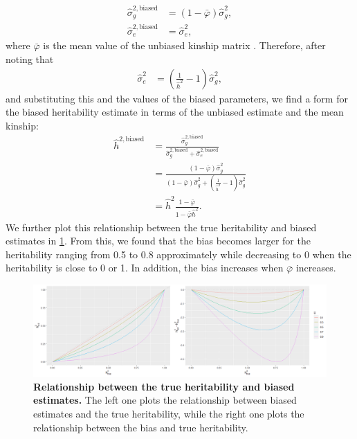 \documentclass[11pt]{article}
\begin{document}
\begin{align*}
  \hat{\sigma}^{2,\text{biased}}_g
  &=
    (1 - \bar{\varphi}) \hat{\sigma}^2_g
    , \\
  \hat{\sigma}^{2,\text{biased}}_e
  &=
    \hat{\sigma}^2_e
    ,
\end{align*}
where $\bar{\varphi}$ is the mean value of the unbiased kinship matrix \citep{hou2023genetic}.
Therefore, after noting that
\begin{align*}
  \hat{\sigma}^2_e
  &=
    \left( \frac{ 1 }{ \hat{h}^2 } - 1 \right) \hat{\sigma}^2_g 
    ,
\end{align*}
and substituting this and the values of the biased parameters, we find a form for the biased heritability estimate in terms of the unbiased estimate and the mean kinship:
\begin{align*}
  \hat{h}^{2,\text{biased}}
  &=
    \frac{
    \hat{\sigma}^{2,\text{biased}}_g
    }{
    \hat{\sigma}^{2,\text{biased}}_g + \hat{\sigma}^{2,\text{biased}}_e
    }
  \\
  &=
    \frac{
    (1 - \bar{\varphi}) \hat{\sigma}^2_g
    }{
    (1 - \bar{\varphi}) \hat{\sigma}^2_g
    + \left( \frac{ 1 }{ \hat{h}^2 } - 1 \right) \hat{\sigma}^2_g 
    }
  \\
  &=
    \hat{h}^2
    \frac{
    1 - \bar{\varphi}
    }{
    1 - \bar{\varphi} \hat{h}^2
    }
    .
\end{align*}
We further plot this relationship between the true heritability and biased estimates in \cref{fig:h}. From this, we found that the bias becomes larger for the heritability ranging from 0.5 to 0.8 approximately while decreasing to 0 when the heritability is close to 0 or 1. In addition, the bias increases when $\bar{\varphi}$ increases.
\begin{figure}[bp!]
  \centering
  \includegraphics[width=\textwidth]{data/h_both.png}
  \caption{
    {\bf Relationship between the true heritability and biased estimates.}
    The left one plots the relationship between biased estimates and the true heritability, while the right one plots the relationship between the bias and true heritability.
    }
  \label{fig:h}
\end{figure}
\end{document}
